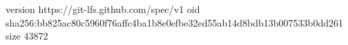 version https://git-lfs.github.com/spec/v1
oid sha256:bb825ac80c5960f76affc4ba1b8e0efbe32ed55ab14d8bdb13b007533b0dd261
size 43872
